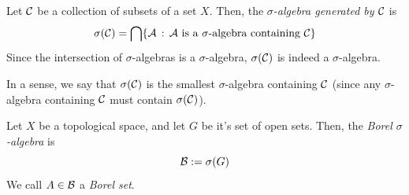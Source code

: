\begin{definition}
    Let $\cal{C}$ be a collection of subsets of a set $X$. Then, the \emph{$\sigma$-algebra generated by $\cal{C}$} is 
    \[ \sigma(\cal{C}) = \bigcap \{\cal{A} \col \cal{A} \text{ is a } \sigma \text{-algebra containing } \cal{C}\} \]
    Since the intersection of $\sigma$-algebras is a $\sigma$-algebra, $\sigma(\cal{C})$ is indeed a $\sigma$-algebra.
\end{definition}
In a sense, we say that $\sigma(\cal{C})$ is the smallest $\sigma$-algebra containing $\cal{C}$ (since any $\sigma$-algebra containing $\cal{C}$ must contain $\sigma(\cal{C})$). 

\begin{definition}
    Let $X$ be a topological space, and let $G$ be it's set of open sets. Then, the \emph{Borel $\sigma$-algebra} is
    \[ \cal{B} := \sigma(G) \]
    We call $A \in \cal{B}$ a \emph{Borel set}.
\end{definition}

